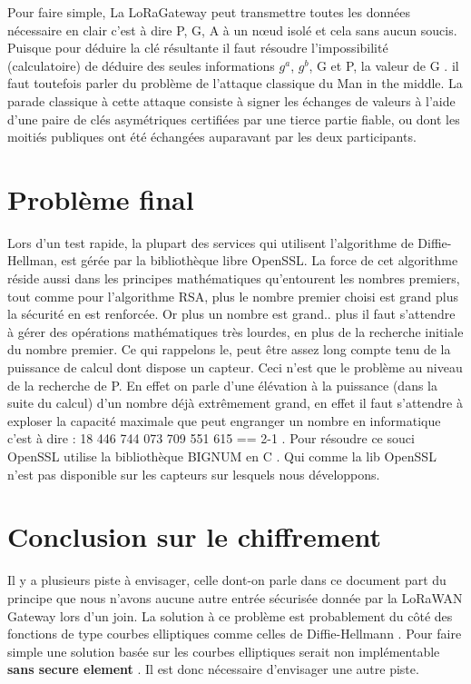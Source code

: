 Pour faire simple, La LoRaGateway peut transmettre toutes les données nécessaire en clair c'est à dire P, G, A  à un n\oe{}ud isolé et cela sans aucun soucis. Puisque pour déduire la clé résultante il faut résoudre l'impossibilité (calculatoire) de déduire des seules informations $g^a$, $g^b$, G et P, la valeur de G .
il faut toutefois parler du problème de l'attaque classique du Man in the middle. La parade classique à cette attaque consiste à signer les échanges de valeurs à l'aide d'une paire de clés asymétriques certifiées par une tierce partie fiable, ou dont les moitiés publiques ont été échangées auparavant par les deux participants.

\section{Problème final }
Lors d'un test rapide, la plupart des services qui utilisent l'algorithme de Diffie-Hellman, est gérée par la bibliothèque libre OpenSSL. La force de cet algorithme réside aussi dans les principes mathématiques qu'entourent les nombres premiers, tout comme pour l'algorithme RSA, plus le nombre premier choisi est grand plus la sécurité en est renforcée. Or plus un nombre est grand.. plus il faut s'attendre à gérer des opérations mathématiques très lourdes, en plus de la recherche initiale du nombre premier. Ce qui rappelons le, peut être assez long compte tenu de la puissance de calcul dont dispose un capteur. Ceci n'est que le problème au niveau de la recherche de P. En effet on parle d'une élévation à la puissance (dans la suite du calcul) d'un nombre déjà extrêmement grand, en effet il faut s'attendre à exploser la capacité maximale que peut engranger un nombre en informatique c'est à dire : 18 446 744 073 709 551 615 == 2-1 . Pour résoudre ce souci OpenSSL utilise la bibliothèque BIGNUM en C . Qui comme la lib OpenSSL n'est pas disponible sur les capteurs sur lesquels nous développons. 
\section{Conclusion sur le chiffrement}
Il y a plusieurs piste à envisager, celle dont-on parle dans ce document part du principe que nous n'avons aucune autre entrée sécurisée donnée par la LoRaWAN Gateway lors d'un join. La solution à ce problème est probablement du côté des fonctions de type courbes elliptiques comme celles de Diffie-Hellmann . Pour faire simple une solution basée sur les courbes elliptiques serait non implémentable \textbf{sans secure element} . Il est donc nécessaire d'envisager une autre piste. 


